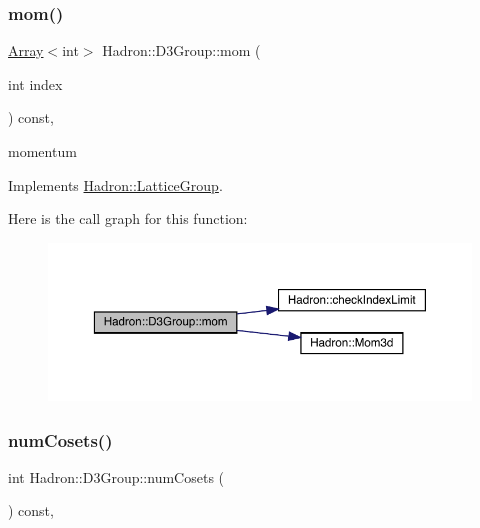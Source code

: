 \subsubsection{\texorpdfstring{mom()}{mom()}\hspace{0.1cm}{\footnotesize\ttfamily [2/2]}}
{\footnotesize\ttfamily \mbox{\hyperlink{classXMLArray_1_1Array}{Array}}$<$int$>$ Hadron\+::\+D3\+Group\+::mom (\begin{DoxyParamCaption}\item[{int}]{index }\end{DoxyParamCaption}) const\hspace{0.3cm}{\ttfamily [inline]}, {\ttfamily [virtual]}}

momentum 

Implements \mbox{\hyperlink{structHadron_1_1LatticeGroup_ad577b65041dd9a6e84b1f3bd49cb8fce}{Hadron\+::\+Lattice\+Group}}.

Here is the call graph for this function\+:
\nopagebreak
\begin{figure}[H]
\begin{center}
\leavevmode
\includegraphics[width=350pt]{de/de1/structHadron_1_1D3Group_a5662028a7fb3554c893609148e6d3eeb_cgraph}
\end{center}
\end{figure}
\mbox{\label{structHadron_1_1D3Group_a33af6b6378351a7b023c23940c69403f}} 
\subsubsection{\texorpdfstring{numCosets()}{numCosets()}\hspace{0.1cm}{\footnotesize\ttfamily [1/2]}}
{\footnotesize\ttfamily int Hadron\+::\+D3\+Group\+::num\+Cosets (\begin{DoxyParamCaption}{ }\end{DoxyParamCaption}) const\hspace{0.3cm}{\ttfamily [inline]}, {\ttfamily [virtual]}}

